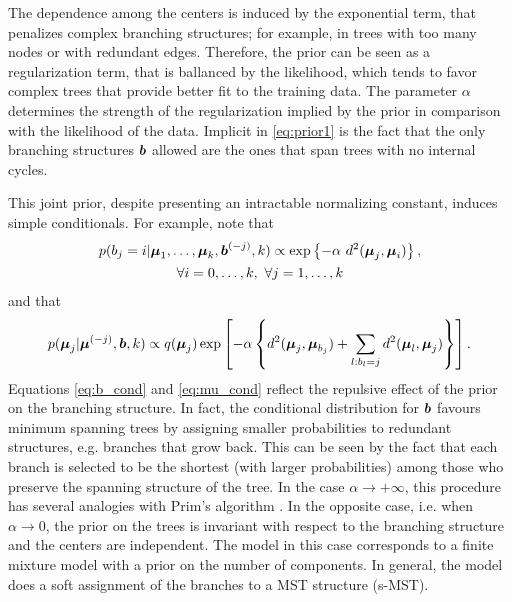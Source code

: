 The dependence among the centers is induced by the exponential term,
that penalizes complex branching structures; for example, in trees
with too many nodes or with redundant edges. Therefore, the prior can
be seen as a regularization term, that is ballanced by the
likelihood, which tends to favor complex trees that provide better
fit to the training data. The parameter $\alpha$ determines the
strength of the regularization implied by the prior in comparison with
the likelihood of the data. Implicit in \eqref{eq:prior1} is the fact
that the only branching structures $\mbox{\boldmath $b$}$ allowed are the ones that
span trees with no internal cycles.


This joint prior, despite presenting an intractable normalizing
constant, induces simple conditionals. For example, note that  
\begin{multline}
  p(b_j = i | \mbox{\boldmath $\mu$}_1, \dots, \mbox{\boldmath $\mu$}_k, \mbox{\boldmath $b$}^{(-j)},  k)
  \propto \exp \left\{ - \alpha \ d^2(\mbox{\boldmath $\mu$}_j, \mbox{\boldmath $\mu$}_i) \right\},
  \\ \forall i = 0, \dots, k ,\ \forall j = 1, \dots, k 
  \label{eq:b_cond}
\end{multline}
and that 
\begin{equation}
  p(\mbox{\boldmath $\mu$}_j | \mbox{\boldmath $\mu$}^{(-j)}, \mbox{\boldmath $b$}, k) \propto q(\mbox{\boldmath $\mu$}_j) \exp
  \left[ - \alpha \left\{ d^2(\mbox{\boldmath $\mu$}_j, \mbox{\boldmath $\mu$}_{b_j}) + \sum_{l : b_l
        = j} d^2(\mbox{\boldmath $\mu$}_l, \mbox{\boldmath $\mu$}_j) \right\} \right]. 
  \label{eq:mu_cond}
\end{equation}
Equations \eqref{eq:b_cond} and \eqref{eq:mu_cond} reflect the repulsive
effect of the prior on the branching structure.  In fact, the
conditional distribution for $\mbox{\boldmath $b$}$ favours minimum spanning trees
by assigning smaller probabilities to redundant structures,
e.g. branches that grow back.  This can be seen by the fact that each
branch is selected to be the shortest (with larger probabilities)
among those who preserve the spanning structure of the tree.  In the
case $\alpha \rightarrow +\infty$, this procedure has several
analogies with Prim's algorithm \citep[see][]{prim1957shortest}.  In
the opposite case, i.e. when $\alpha \rightarrow 0$, the prior on the
trees is invariant with respect to the branching structure and the
centers are independent.  The model in this case corresponds to a
finite mixture model with a prior on the number of components.  In
general, the model does a soft assignment of the branches to a MST
structure (s-MST).

